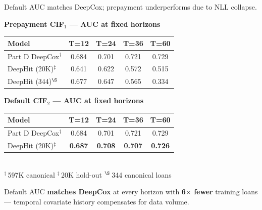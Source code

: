 \documentclass[10pt,aspectratio=169]{beamer}
\begin{document}
\begin{frame}{Default AUC matches DeepCox; prepayment underperforms due to NLL collapse.}
    \begin{center}
        \small\textbf{Prepayment CIF$_1$ — AUC at fixed horizons}\\[4pt]
        \begin{tabular}{lcccc}
            \toprule
            \textbf{Model} & \textbf{T=12} & \textbf{T=24} & \textbf{T=36} & \textbf{T=60} \\
            \midrule
            Part D DeepCox$^\dagger$ & 0.684 & 0.701 & 0.721 & 0.729 \\
            DeepHit (20K)$^\ddagger$ & 0.641 & 0.622 & 0.572 & 0.515 \\
            DeepHit (344)$^\S$       & 0.677 & 0.647 & 0.565 & 0.334 \\
            \bottomrule
        \end{tabular}

        \vspace{8pt}
        \small\textbf{Default CIF$_2$ — AUC at fixed horizons}\\[4pt]
        \begin{tabular}{lcccc}
            \toprule
            \textbf{Model} & \textbf{T=12} & \textbf{T=24} & \textbf{T=36} & \textbf{T=60} \\
            \midrule
            Part D DeepCox$^\dagger$  & 0.684 & 0.701 & 0.721 & 0.729 \\
            DeepHit (20K)$^\ddagger$  & \textbf{0.687} & \textbf{0.708} & \textbf{0.707} & \textbf{0.726} \\
            \bottomrule
        \end{tabular}
        \vspace{3pt}\\
        \tiny $^\dagger$\,597K canonical\enspace
               $^\ddagger$\,20K hold-out\enspace
               $^\S$\,344 canonical loans
    \end{center}

    \vfill
    \begin{center}
        \small
        Default AUC \textbf{matches DeepCox} at every horizon with \textbf{6$\times$ fewer} training loans ---
        temporal covariate history compensates for data volume.
    \end{center}
\end{frame}
\end{document}
